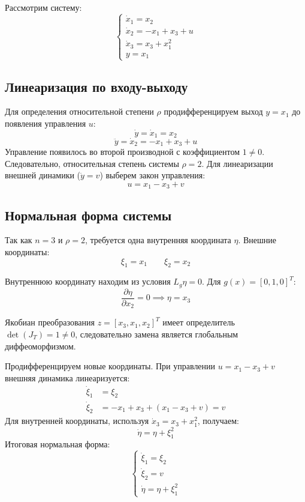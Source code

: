 \documentclass[a4paper,12pt]{article}
\begin{document}
Рассмотрим систему:
\begin{equation}
	\begin{cases}
		\dot{x}_1 = x_2 \\
		\dot{x}_2 = -x_1 + x_3 + u \\
		\dot{x}_3 = x_3 + x_1^2 \\
		y = x_1
	\end{cases}
\end{equation}

\subsection{Линеаризация по входу-выходу}
Для определения относительной степени $\rho$ продифференцируем выход $y=x_1$ до появления управления $u$:
$$ \dot{y} = \dot{x}_1 = x_2 $$
$$ \ddot{y} = \dot{x}_2 = -x_1 + x_3 + u $$
Управление появилось во второй производной с коэффициентом $1 \neq 0$. Следовательно, относительная степень системы $\rho = 2$.
Для линеаризации внешней динамики ($\ddot{y}=v$) выберем закон управления:
$$ u = x_1 - x_3 + v $$

\subsection{Нормальная форма системы}

Так как $n=3$ и $\rho=2$, требуется одна внутренняя координата $\eta$. Внешние координаты:
\[
\xi_1 = x_1 \qquad \xi_2 = x_2
\]

Внутреннюю координату находим из условия $L_g \eta = 0$. Для $g(x)=[0, 1, 0]^T$:
\[
\frac{\partial \eta}{\partial x_2} = 0 \implies \eta = x_3
\]

Якобиан преобразования $z=[x_3, x_1, x_2]^T$ имеет определитель $\det(J_T)=1 \neq 0$, следовательно замена является глобальным диффеоморфизмом.

Продифференцируем новые координаты. При управлении $u = x_1 - x_3 + v$ внешняя динамика линеаризуется:
\begin{align*}
	\dot{\xi}_1 &= \xi_2 \\
	\dot{\xi}_2 &= -x_1 + x_3 + (x_1 - x_3 + v) = v
\end{align*}
Для внутренней координаты, используя $\dot{x}_3 = x_3 + x_1^2$, получаем:
\[
\dot{\eta} = \eta + \xi_1^2
\]
Итоговая нормальная форма:
\[
\begin{cases}
	\dot{\xi}_1 = \xi_2 \\
	\dot{\xi}_2 = v \\
	\dot{\eta} = \eta + \xi_1^2
\end{cases}
\]
\end{document}
